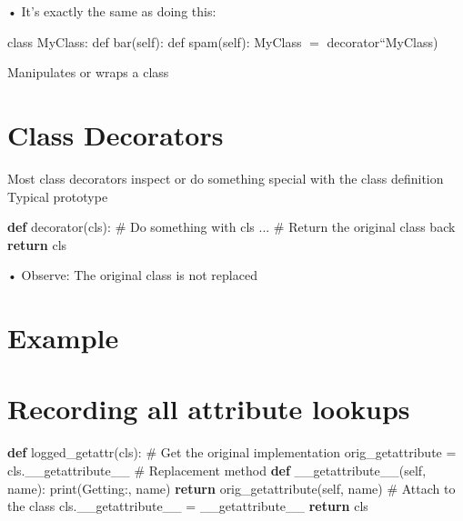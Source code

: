 \documentclass[
  letterpaper,
  DIV=11,
  numbers=noendperiod]{scrreprt}
\newenvironment{Shaded}{\begin{snugshade}}{\end{snugshade}}
\newcommand{\BuiltInTok}[1]{\textcolor[rgb]{0.00,0.23,0.31}{#1}}
\newcommand{\CommentTok}[1]{\textcolor[rgb]{0.37,0.37,0.37}{#1}}
\newcommand{\ControlFlowTok}[1]{\textcolor[rgb]{0.00,0.23,0.31}{\textbf{#1}}}
\newcommand{\FunctionTok}[1]{\textcolor[rgb]{0.28,0.35,0.67}{#1}}
\newcommand{\KeywordTok}[1]{\textcolor[rgb]{0.00,0.23,0.31}{\textbf{#1}}}
\newcommand{\NormalTok}[1]{\textcolor[rgb]{0.00,0.23,0.31}{#1}}
\newcommand{\OperatorTok}[1]{\textcolor[rgb]{0.37,0.37,0.37}{#1}}
\newcommand{\StringTok}[1]{\textcolor[rgb]{0.13,0.47,0.30}{#1}}
\newcommand{\VariableTok}[1]{\textcolor[rgb]{0.07,0.07,0.07}{#1}}
\begin{document}
• It's exactly the same as doing this:

class MyClass: def bar(self): def spam(self): MyClass \(=\)
decorator``MyClass)

Manipulates or wraps a class


\chapter{Class Decorators}\label{class-decorators-1}

Most class decorators inspect or do something special with the class
definition\\
Typical prototype

\begin{Shaded}
\begin{Highlighting}[]
\KeywordTok{def}\NormalTok{ decorator(cls):}
    \CommentTok{\# Do something with cls}
\NormalTok{    ...}
    \CommentTok{\# Return the original class back}
    \ControlFlowTok{return}\NormalTok{ cls }
\end{Highlighting}
\end{Shaded}

• Observe: The original class is not replaced


\chapter{Example}\label{example-4}


\chapter{Recording all attribute
lookups}\label{recording-all-attribute-lookups}

\begin{Shaded}
\begin{Highlighting}[]
\KeywordTok{def}\NormalTok{ logged\_getattr(cls):}
    \CommentTok{\# Get the original implementation}
\NormalTok{    orig\_getattribute }\OperatorTok{=}\NormalTok{ cls.}\FunctionTok{\_\_getattribute\_\_}
    \CommentTok{\# Replacement method}
    \KeywordTok{def} \FunctionTok{\_\_getattribute\_\_}\NormalTok{(}\VariableTok{self}\NormalTok{, name):}
        \BuiltInTok{print}\NormalTok{(}\StringTok{\textquotesingle{}Getting:\textquotesingle{}}\NormalTok{, name)}
        \ControlFlowTok{return}\NormalTok{ orig\_getattribute(}\VariableTok{self}\NormalTok{, name)}
    \CommentTok{\# Attach to the class}
\NormalTok{    cls.}\FunctionTok{\_\_getattribute\_\_} \OperatorTok{=} \FunctionTok{\_\_getattribute\_\_}
    \ControlFlowTok{return}\NormalTok{ cls }
\end{Highlighting}
\end{Shaded}
\end{document}

